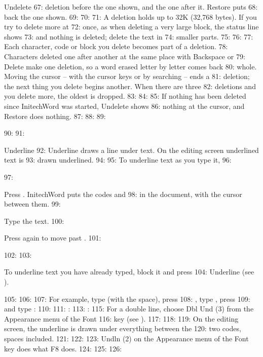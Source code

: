 \begin{Feature}{Undelete}
67: deletion before the one shown, and  the one after it.  Restore puts
68: back the one shown.
69: 
70: 
71: A deletion holds up to 32K (32,768 bytes).  If you try to delete more at
72: once, as when deleting a very large block, the status line shows
73:  and nothing is deleted; delete the text in
74: smaller parts.
75: 
76: 
77: Each character, code or block you delete becomes part of a deletion.
78: Characters deleted one after another at the same place with Backspace or
79: Delete make one deletion, so a word erased letter by letter comes back
80: whole.  Moving the cursor -- with the cursor keys or by searching -- ends a
81: deletion; the next thing you delete begins another.  When there are three
82: deletions and you delete more, the oldest is dropped.
83: 
84: 
85: If nothing has been deleted since InitechWord was started, Undelete shows
86: nothing at the cursor, and Restore does nothing.
87: 
88: 
89: \end{Feature}
90: 
91: \begin{Feature}{Underline}
92: Underline draws a line under text.  On the editing screen underlined text is
93: drawn underlined.
94: 
95: To underline text as you type it,
96: \begin{WPSteps}
97: \item Press .  InitechWord puts the codes \Code{[UND]} and
98: \Code{[und]} in the document, with the cursor between them.
99: \item Type the text.
100: \item Press  again to move past \Code{[und]}.
101: \end{WPSteps}
102: 
103: \begin{WPNote}To underline text you have already typed, block it and press
104: Underline (see ).\end{WPNote}
105: 
106: 
107: For example, type  (with the space), press
108: , type , press 
109: and type :
110: 
111: : 
113: : 
115: For a double line, choose Dbl Und (3) from the Appearance menu of the Font
116: key (see ).
117: 
118: 
119: On the editing screen, the underline is drawn under everything between the
120: two codes, spaces included.
121: 
122: 
123: Undln (2) on the Appearance menu of the Font key does what F8 does.
124: 
125: 
126: \end{Feature}
